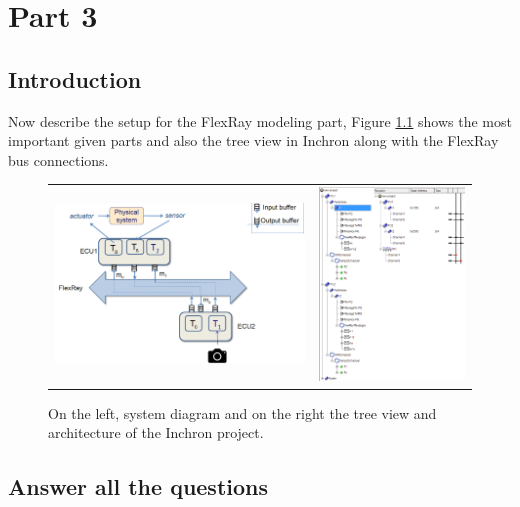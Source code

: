 \chapter{Part 3}

\section{Introduction}

Now describe the setup for the FlexRay modeling part, Figure \ref{fig:FRdia} shows the most important given parts and also the tree view in Inchron along with the FlexRay bus connections.

\begin{figure}[h!]
	\begin{center}
		
			\begin{tabular}{cc}
				\includegraphics[width=0.5\linewidth]{img/FR-diagram} & \includegraphics[width=0.35\linewidth]{img/FR-setup}	\\
			\end{tabular}
			\caption{On the left, system diagram and on the right the tree view and architecture of the Inchron project. }
		\label{fig:FRdia}
	\end{center}
\end{figure}


\section{Answer all the questions}


